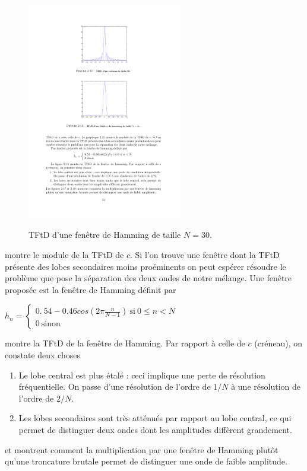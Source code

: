 \begin{figure}
  \centering
  \includegraphics[width=0.6\textwidth]{Figures/Figure2-16}\\
  \caption{TFtD d'une fen\^{e}tre de Hamming de taille $N=30.$}\label{fig:figure2-16}
\end{figure}
 montre le module de la TFtD de $c$. Si l'on trouve une fen\^{e}tre dont la TFtD pr\'{e}sente des lobes secondaires moins pro\'{e}minents on peut esp\'{e}rer r\'{e}soudre le probl\`{e}me que pose la s\'{e}paration des deux ondes de notre m\'{e}lange. Une fen\^{e}tre propos\'{e}e est la fen\^{e}tre de Hamming d\'{e}finit par

$h_{n}=\left\{\begin{array}{l}
0.\ 54-0.46cos(2\pi\frac{n}{N-1})\ \mathrm{s}\mathrm{i}\ 0\leq n<N\\
0\ \mathrm{s}\mathrm{i}\mathrm{n}\mathrm{o}\mathrm{n}
\end{array}\right.$

 montre la TFtD de la fen\^{e}tre de Hamming.
Par rapport \`{a} celle de $c$ (cr\'{e}neau), on constate deux choses
\begin{enumerate}
\item Le lobe central est plus \'{e}tal\'{e} : ceci implique une perte de r\'{e}solution fr\'{e}quentielle. On passe d'une r\'{e}solution de l'ordre de $1/N$ \`{a} une r\'{e}solution de l'ordre de $2/N.$
\item Les lobes secondaires sont très atténués par rapport au  lobe central, ce qui permet de distinguer deux ondes dont les amplitudes diff\`{e}rent grandement.
\end{enumerate}
et   montrent comment la multiplication par une fen\^{e}tre de Hamming plut\^{o}t qu'une troncature brutale permet de distinguer une onde de faible amplitude.


